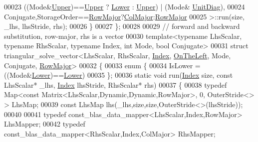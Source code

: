 \begin{DoxyCode}
00023         ((Mode&\hyperlink{group__enums_gga39e3366ff5554d731e7dc8bb642f83cda6bcb58be3b8b8ec84859ce0c5ac0aaec}{Upper})==\hyperlink{group__enums_gga39e3366ff5554d731e7dc8bb642f83cda6bcb58be3b8b8ec84859ce0c5ac0aaec}{Upper} ? \hyperlink{group__enums_gga39e3366ff5554d731e7dc8bb642f83cda891792b8ed394f7607ab16dd716f60e6}{Lower} : \hyperlink{group__enums_gga39e3366ff5554d731e7dc8bb642f83cda6bcb58be3b8b8ec84859ce0c5ac0aaec}{Upper}) | (Mode&
      \hyperlink{group__enums_gga39e3366ff5554d731e7dc8bb642f83cdaddb72f888ac85d5a1c52333e54f9374b}{UnitDiag}),
00024         Conjugate,StorageOrder==\hyperlink{group__enums_ggaacded1a18ae58b0f554751f6cdf9eb13acfcde9cd8677c5f7caf6bd603666aae3}{RowMajor}?\hyperlink{group__enums_ggaacded1a18ae58b0f554751f6cdf9eb13a0cbd4bdd0abcfc0224c5fcb5e4f6669a}{ColMajor}:\hyperlink{group__enums_ggaacded1a18ae58b0f554751f6cdf9eb13acfcde9cd8677c5f7caf6bd603666aae3}{RowMajor}
00025       >::run(size, \_lhs, lhsStride, rhs);
00026   \}
00027 \};
00028 
00029 \textcolor{comment}{// forward and backward substitution, row-major, rhs is a vector}
00030 \textcolor{keyword}{template}<\textcolor{keyword}{typename} LhsScalar, \textcolor{keyword}{typename} RhsScalar, \textcolor{keyword}{typename} Index, \textcolor{keywordtype}{int} Mode, \textcolor{keywordtype}{bool} Conjugate>
00031 \textcolor{keyword}{struct }triangular\_solve\_vector<LhsScalar, RhsScalar, \hyperlink{namespace_eigen_a62e77e0933482dafde8fe197d9a2cfde}{Index}, \hyperlink{group__enums_ggac22de43beeac7a78b384f99bed5cee0ba129609b3bdf23b071f5f86cf2f995ec4}{OnTheLeft}, Mode, Conjugate, 
      \hyperlink{group__enums_ggaacded1a18ae58b0f554751f6cdf9eb13acfcde9cd8677c5f7caf6bd603666aae3}{RowMajor}>
00032 \{
00033   \textcolor{keyword}{enum} \{
00034     IsLower = ((Mode&\hyperlink{group__enums_gga39e3366ff5554d731e7dc8bb642f83cda891792b8ed394f7607ab16dd716f60e6}{Lower})==\hyperlink{group__enums_gga39e3366ff5554d731e7dc8bb642f83cda891792b8ed394f7607ab16dd716f60e6}{Lower})
00035   \};
00036   \textcolor{keyword}{static} \textcolor{keywordtype}{void} run(\hyperlink{namespace_eigen_a62e77e0933482dafde8fe197d9a2cfde}{Index} size, \textcolor{keyword}{const} LhsScalar* \_lhs, \hyperlink{namespace_eigen_a62e77e0933482dafde8fe197d9a2cfde}{Index} lhsStride, RhsScalar* rhs)
00037   \{
00038     \textcolor{keyword}{typedef} Map<const Matrix<LhsScalar,Dynamic,Dynamic,RowMajor>, 0, OuterStride<> > LhsMap;
00039     \textcolor{keyword}{const} LhsMap lhs(\_lhs,size,size,OuterStride<>(lhsStride));
00040 
00041     \textcolor{keyword}{typedef} const\_blas\_data\_mapper<LhsScalar,Index,RowMajor> LhsMapper;
00042     \textcolor{keyword}{typedef} const\_blas\_data\_mapper<RhsScalar,Index,ColMajor> RhsMapper;

\end{DoxyCode}
